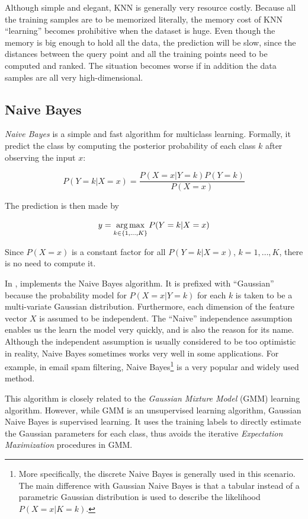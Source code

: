 Although simple and elegant, KNN is generally very resource costly. Because all
the training samples are to be memorized literally, the memory cost of KNN
``learning'' becomes prohibitive when the dataset is huge. Even though the
memory is big enough to hold all the data, the prediction will be slow, since
the distances between the query point and all the training points need to be
computed and ranked. The situation becomes worse if in addition the data
samples are all very high-dimensional.

\subsection{Naive Bayes}
\emph{Naive Bayes} is a simple and fast algorithm for multiclass learning.
Formally, it predict the class by computing the posterior probability of each
class $k$ after observing the input $x$:

\[
	P\left( Y=k | X = x \right) = \frac{P(X=x|Y=k)P(Y=k)}{P(X=x)}
\]

The prediction is then made by

\[
	y = \operatorname*{arg\,max}_{k\in\{1,\ldots,K\}} P(Y=k|X=x)
\]

Since $P(X=x)$ is a constant factor for all $P(Y=k|X=x)$, $k=1,\ldots,K$, there
is no need to compute it.

In \shogun{},  implements the Naive Bayes
algorithm. It is prefixed with ``Gaussian'' because the probability model for
$P(X=x|Y=k)$ for each $k$ is taken to be a multi-variate Gaussian distribution.
Furthermore, each dimension of the feature vector $X$ is assumed to be
independent. The ``Naive'' independence assumption enables us the learn the
model very quickly, and is also the reason for its name. Although the
independent assumption is usually considered to be too optimistic in reality,
Naive Bayes sometimes works very well in some applications. For example, in
email spam filtering, Naive Bayes\footnote{More specifically, the discrete
	Naive Bayes is generally used in this scenario. The main difference with
	Gaussian Naive Bayes is that a tabular instead of a parametric Gaussian
	distribution is used to describe the likelihood $P(X=x|K=k)$.} is a very
popular and widely used method.

This algorithm is closely related to the \emph{Gaussian Mixture Model} (GMM) learning
algorithm. However, while GMM is an unsupervised learning algorithm, Gaussian
Naive Bayes is supervised learning. It uses the training labels to directly
estimate the Gaussian parameters for each class, thus avoids the iterative
\emph{Expectation Maximization} procedures in GMM.

